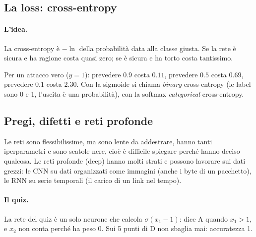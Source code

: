 \subsection{La loss: cross-entropy}
\paragraph*{L'idea.} La cross-entropy è $-\ln$ della probabilità data alla classe giusta. Se la rete è sicura e ha ragione costa quasi zero; se è sicura e ha torto costa tantissimo.

Per un attacco vero ($y = 1$): prevedere $0.9$ costa $0.11$, prevedere $0.5$ costa $0.69$, prevedere $0.1$ costa $2.30$. Con la sigmoide si chiama \emph{binary} cross-entropy (le label sono 0 e 1, l'uscita è una probabilità), con la softmax \emph{categorical} cross-entropy.

\subsection{Pregi, difetti e reti profonde}
Le reti sono flessibilissime, ma sono lente da addestrare, hanno tanti iperparametri e sono scatole nere, cioè è difficile spiegare perché hanno deciso qualcosa. Le reti profonde (deep) hanno molti strati e possono lavorare sui dati grezzi: le CNN su dati organizzati come immagini (anche i byte di un pacchetto), le RNN su serie temporali (il carico di un link nel tempo).

\paragraph*{Il quiz.} La rete del quiz è un solo neurone che calcola $\sigma(x_1 - 1)$: dice A quando $x_1 > 1$, e $x_2$ non conta perché ha peso 0. Sui 5 punti di D non sbaglia mai: accuratezza 1.

